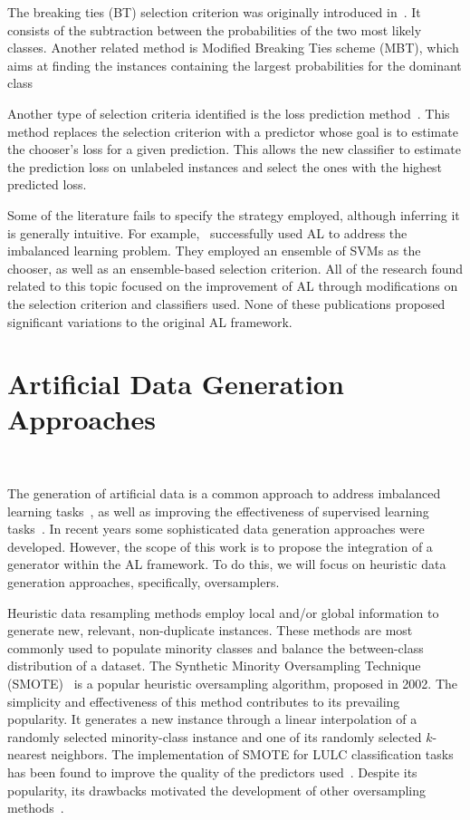 The breaking ties (BT) selection criterion was originally introduced
in~\cite{Luo2003}. It consists of the subtraction between the probabilities of
the two most likely classes. Another related method is Modified Breaking Ties
scheme (MBT), which aims at finding the instances containing the largest
probabilities for the dominant class~\cite{Liu2018,Li2012a}

Another type of selection criteria identified is the loss prediction
method~\cite{Yoo2019}. This method replaces the selection criterion with a
predictor whose goal is to estimate the chooser's loss for a given
prediction. This allows the new classifier to estimate the prediction loss on
unlabeled instances and select the ones with the highest predicted loss.

Some of the literature fails to specify the strategy employed, although
inferring it is generally intuitive. For example,~\cite{Ertekin2007}
successfully used AL to address the imbalanced learning problem. They employed
an ensemble of SVMs as the chooser, as well as an ensemble-based selection
criterion. All of the research found related to this topic focused on the
improvement of AL through modifications on the selection criterion and
classifiers used. None of these publications proposed significant variations
to the original AL framework.

\section{Artificial Data Generation Approaches}~\label{sec:ovs-sota-al-generator}

The generation of artificial data is a common approach to address imbalanced
learning tasks~\cite{Kaur2019}, as well as improving the effectiveness of
supervised learning tasks~\cite{DeVries2017}. In recent years some
sophisticated data generation approaches were developed. However, the scope of
this work is to propose the integration of a generator within the AL
framework. To do this, we will focus on heuristic data generation approaches,
specifically, oversamplers.

Heuristic data resampling methods employ local and/or global information to
generate new, relevant, non-duplicate instances. These methods are most
commonly used to populate minority classes and balance the between-class
distribution of a dataset. The Synthetic Minority Oversampling Technique
(SMOTE)~\cite{Chawla2002} is a popular heuristic oversampling algorithm,
proposed in 2002. The simplicity and effectiveness of this method contributes
to its prevailing popularity. It generates a new instance through a linear
interpolation of a randomly selected minority-class instance and one of its
randomly selected $k$-nearest neighbors. The implementation of SMOTE for LULC
classification tasks has been found to improve the quality of the predictors
used~\cite{Jozdani2019,Bogner2018}. Despite its popularity, its drawbacks
motivated the development of other oversampling methods~\cite{Douzas2019}.

